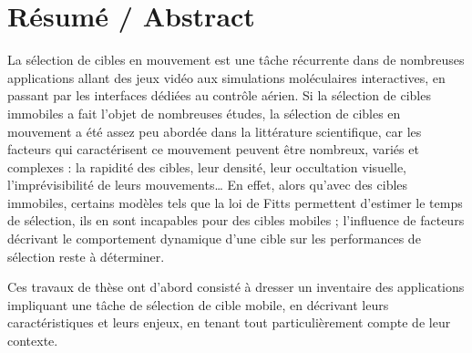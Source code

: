 
\chapter*{Résumé / Abstract}%

\mtcaddchapter %

%

\pagestyle{plain}

	La sélection de cibles en mouvement est une tâche récurrente dans de nombreuses applications allant des jeux vidéo aux simulations moléculaires interactives, en passant par les interfaces dédiées au contrôle aérien. Si la sélection de cibles immobiles a fait l'objet de nombreuses études, la sélection de cibles en mouvement a été assez peu abordée dans la littérature scientifique, car les facteurs qui caractérisent ce mouvement peuvent être nombreux, variés et complexes : la rapidité des cibles, leur densité, leur occultation visuelle, l'imprévisibilité de leurs mouvements\ldots{} En effet, alors qu’avec des cibles immobiles, certains modèles tels que la loi de Fitts permettent d’estimer le temps de sélection, ils en sont incapables pour des cibles mobiles ; l'influence de facteurs décrivant le comportement dynamique d'une cible sur les performances de sélection reste à déterminer.

	Ces travaux de thèse ont d'abord consisté à dresser un inventaire des applications impliquant une tâche de sélection de cible mobile, en décrivant leurs caractéristiques et leurs enjeux, en tenant tout particulièrement compte de leur contexte.
	

